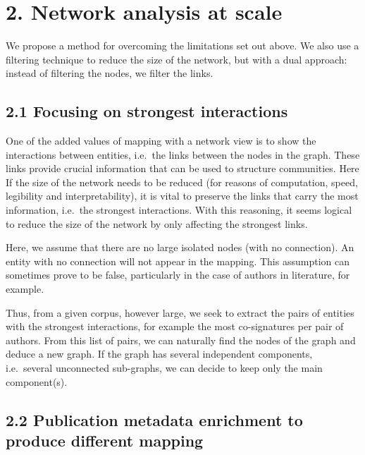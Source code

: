 \documentclass[
]{article}
\begin{document}
\hypertarget{network-analysis-at-scale}{%
\section{2. Network analysis at scale}\label{network-analysis-at-scale}}

We propose a method for overcoming the limitations set out above. We
also use a filtering technique to reduce the size of the network, but
with a dual approach: instead of filtering the nodes, we filter the
links.

\hypertarget{focusing-on-strongest-interactions}{%
\subsection{2.1 Focusing on strongest
interactions}\label{focusing-on-strongest-interactions}}

One of the added values of mapping with a network view is to show the
interactions between entities, i.e.~the links between the nodes in the
graph. These links provide crucial information that can be used to
structure communities. Here If the size of the network needs to be
reduced (for reasons of computation, speed, legibility and
interpretability), it is vital to preserve the links that carry the most
information, i.e.~the strongest interactions. With this reasoning, it
seems logical to reduce the size of the network by only affecting the
strongest links.

Here, we assume that there are no large isolated nodes (with no
connection). An entity with no connection will not appear in the
mapping. This assumption can sometimes prove to be false, particularly
in the case of authors in literature, for example.

Thus, from a given corpus, however large, we seek to extract the pairs
of entities with the strongest interactions, for example the most
co-signatures per pair of authors. From this list of pairs, we can
naturally find the nodes of the graph and deduce a new graph. If the
graph has several independent components, i.e.~several unconnected
sub-graphs, we can decide to keep only the main component(s).

\hypertarget{publication-metadata-enrichment-to-produce-different-mapping}{%
\subsection{2.2 Publication metadata enrichment to produce different
mapping}\label{publication-metadata-enrichment-to-produce-different-mapping}}
\end{document}
